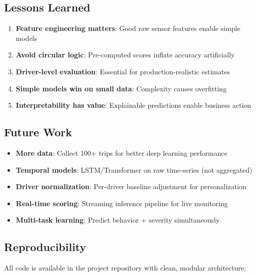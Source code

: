\documentclass[11pt,a4paper]{article}
\begin{document}
\subsection{Lessons Learned}

\begin{enumerate}[leftmargin=*]
    \item \textbf{Feature engineering matters}: Good raw sensor features enable simple models
    \item \textbf{Avoid circular logic}: Pre-computed scores inflate accuracy artificially
    \item \textbf{Driver-level evaluation}: Essential for production-realistic estimates
    \item \textbf{Simple models win on small data}: Complexity causes overfitting
    \item \textbf{Interpretability has value}: Explainable predictions enable business action
\end{enumerate}

\subsection{Future Work}

\begin{itemize}[leftmargin=*]
    \item \textbf{More data}: Collect 100+ trips for better deep learning performance
    \item \textbf{Temporal models}: LSTM/Transformer on raw time-series (not aggregated)
    \item \textbf{Driver normalization}: Per-driver baseline adjustment for personalization
    \item \textbf{Real-time scoring}: Streaming inference pipeline for live monitoring
    \item \textbf{Multi-task learning}: Predict behavior + severity simultaneously
\end{itemize}

\subsection{Reproducibility}

All code is available in the project repository with clean, modular architecture:
\end{document}
